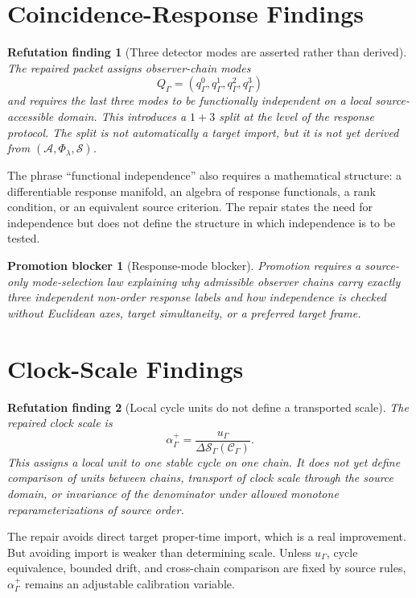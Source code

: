 \documentclass[11pt]{article}
\newcommand{\Sub}{\mathcal{A}}
\newcommand{\PhiFlow}{\Phi_{\lambda}}
\newcommand{\Order}{\mathcal{S}}
\newcommand{\Cycle}{\mathcal{C}_{\Gamma}}
\newtheorem{refutationfinding}{Refutation finding}
\newtheorem{blocker}{Promotion blocker}
\begin{document}
\section{Coincidence-Response Findings}

\begin{refutationfinding}[Three detector modes are asserted rather than derived]
The repaired packet assigns observer-chain modes
\[
Q_{\Gamma}=(q^0_{\Gamma},q^1_{\Gamma},q^2_{\Gamma},q^3_{\Gamma})
\]
and requires the last three modes to be functionally independent on a local
source-accessible domain. This introduces a \(1+3\) split at the level of the
response protocol. The split is not automatically a target import, but it is
not yet derived from \((\Sub,\PhiFlow,\Order)\).
\end{refutationfinding}

The phrase ``functional independence'' also requires a mathematical structure:
a differentiable response manifold, an algebra of response functionals, a rank
condition, or an equivalent source criterion. The repair states the need for
independence but does not define the structure in which independence is to be
tested.

\begin{blocker}[Response-mode blocker]
Promotion requires a source-only mode-selection law explaining why admissible
observer chains carry exactly three independent non-order response labels and
how independence is checked without Euclidean axes, target simultaneity, or a
preferred target frame.
\end{blocker}

\section{Clock-Scale Findings}

\begin{refutationfinding}[Local cycle units do not define a transported scale]
The repaired clock scale is
\[
\alpha^{+}_{\Gamma}
=
\frac{u_{\Gamma}}{\Delta\Order_{\Gamma}(\Cycle)}.
\]
This assigns a local unit to one stable cycle on one chain. It does not yet
define comparison of units between chains, transport of clock scale through
the source domain, or invariance of the denominator under allowed monotone
reparameterizations of source order.
\end{refutationfinding}

The repair avoids direct target proper-time import, which is a real
improvement. But avoiding import is weaker than determining scale. Unless
\(u_{\Gamma}\), cycle equivalence, bounded drift, and cross-chain comparison
are fixed by source rules, \(\alpha^{+}_{\Gamma}\) remains an adjustable
calibration variable.
\end{document}

